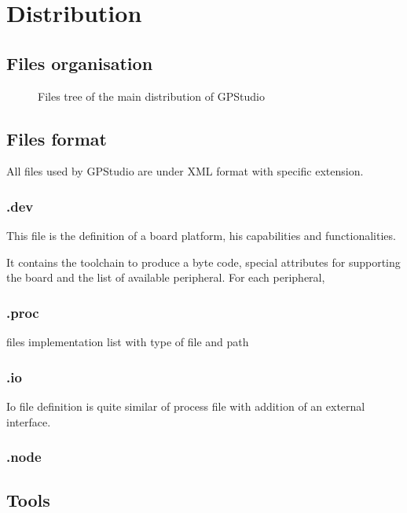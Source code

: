 \chapter{Distribution}

\section{Files organisation}
\begin{figure}[h]
\caption{Files tree of the main distribution of GPStudio}
\label{fig:archivetree}
\end{figure}

\section{Files format}
All files used by GPStudio are under XML format with specific extension.

\subsection{.dev}
This file is the definition of a board platform, his capabilities and functionalities.

It contains the toolchain to produce a byte code, special attributes for supporting the board and the list of available peripheral. For each peripheral, 

\subsection{.proc}
files implementation list with type of file and path

\subsection{.io}
Io file definition is quite similar of process file with addition of an external interface.

\subsection{.node}

\section{Tools}
